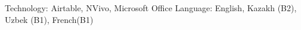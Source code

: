 \vspace{-2ex}
\begin{cvskills}
\cvskill
    {Technology:}
    {Airtable, NVivo, Microsoft Office}
\cvskill
    {Language:}
    {English, Kazakh (B2), Uzbek (B1), French(B1)}
\end{cvskills}